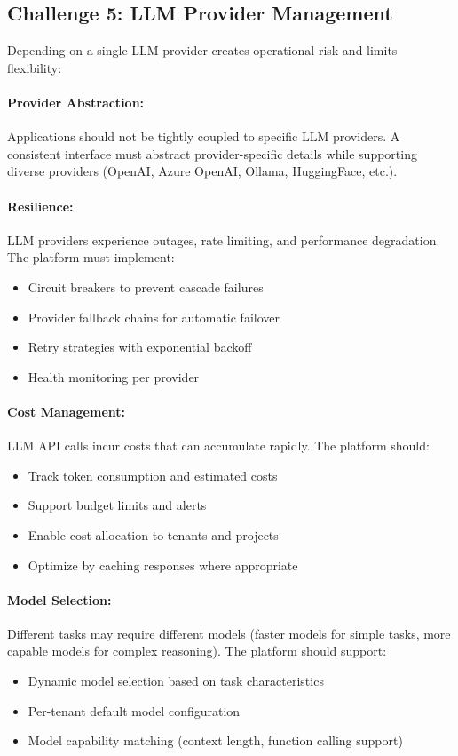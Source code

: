 \subsection{Challenge 5: LLM Provider Management}

Depending on a single LLM provider creates operational risk and limits flexibility:

\paragraph{Provider Abstraction:}
Applications should not be tightly coupled to specific LLM providers. A consistent interface must abstract provider-specific details while supporting diverse providers (OpenAI, Azure OpenAI, Ollama, HuggingFace, etc.).

\paragraph{Resilience:}
LLM providers experience outages, rate limiting, and performance degradation. The platform must implement:
\begin{itemize}
    \item Circuit breakers to prevent cascade failures
    \item Provider fallback chains for automatic failover
    \item Retry strategies with exponential backoff
    \item Health monitoring per provider
\end{itemize}

\paragraph{Cost Management:}
LLM API calls incur costs that can accumulate rapidly. The platform should:
\begin{itemize}
    \item Track token consumption and estimated costs
    \item Support budget limits and alerts
    \item Enable cost allocation to tenants and projects
    \item Optimize by caching responses where appropriate
\end{itemize}

\paragraph{Model Selection:}
Different tasks may require different models (faster models for simple tasks, more capable models for complex reasoning). The platform should support:
\begin{itemize}
    \item Dynamic model selection based on task characteristics
    \item Per-tenant default model configuration
    \item Model capability matching (context length, function calling support)
\end{itemize}

